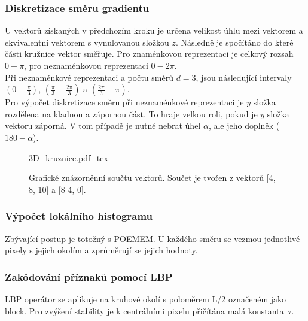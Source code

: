 \documentclass[czech,BP]{thesiskiv}
\begin{document}
\subsubsection{Diskretizace směru gradientu}
U vektorů získaných v předchozím kroku je určena velikost úhlu mezi vektorem a ekvivalentní vektorem s vynulovanou složkou $z$. Následně je spočítáno do které části kružnice vektor směřuje. Pro znaménkovou reprezentaci je celkový rozsah $0 - \pi$, pro neznaménkovou reprezentaci $0 - 2\pi$.
\\
Při neznaménkové reprezentaci a počtu směrů $d = 3$, jsou následující intervaly $\left(0 - \frac{\pi}{3}\right)$, $\left(\frac{\pi}{3} - \frac{2\pi}{3}\right)$ a  $\left(\frac{2\pi}{3} - \pi\right)$.
\\
Pro výpočet diskretizace směru při neznaménkové reprezentaci je $y$ složka rozdělena na kladnou a zápornou část. To hraje velkou roli, pokud je $y$ složka vektoru záporná. V tom případě je nutné nebrat úhel $\alpha$, ale jeho doplněk ($ 180 - \alpha$).

\begin{figure}[H]
    \centering
    \def\svgwidth{\columnwidth}
    {3D_kruznice.pdf_tex} 
    \caption{Grafické znázorněnní součtu vektorů. Součet je tvořen z vektorů [4, 8, 10] a [8 4, 0].}
\end{figure}

\subsubsection{Výpočet lokálního histogramu}
\par Zbývající postup je totožný s POEMEM. U každého směru se vezmou jednotlivé pixely s jejich okolím a zprůměrují se jejich hodnoty. 

\subsubsection{Zakódování příznaků pomocí LBP}
\par LBP operátor se aplikuje na kruhové okolí s poloměrem L/2 označeném jako block. Pro zvýšení stability je k centrálními pixelu přičítána malá konstanta~$\tau$. 
\end{document}
